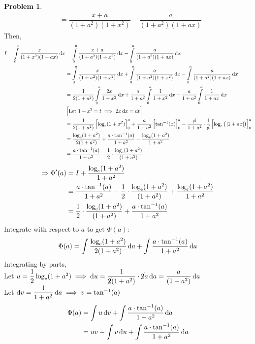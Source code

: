 \documentclass[14]{article}
\theoremstyle{definition}
\newtheorem{prob}{Problem}
\theoremstyle{case}
\begin{document}
\begin{prob}
\begin{align*}
&= \dfrac{x+a}{(1+a^2)(1+x^2)} - \dfrac{a}{(1+a^2)(1+ax)}
\end{align*}
Then,
\begin{align*}
I = \int\limits_0^a \dfrac{x}{(1+x^2)(1+ax)} \dif x &= \int\limits_0^a \dfrac{x+a}{(1+a^2)(1+x^2)} \dif x - \int\limits_0^a \dfrac{a}{(1+a^2)(1+ax)} \dif x\\
&= \int\limits_0^a \dfrac{x}{(1+a^2)(1+x^2)} \dif x + \int\limits_0^a \dfrac{a}{(1+a^2)(1+x^2)} \dif x - \int\limits_0^a \dfrac{a}{(1+a^2)(1+ax)} \dif x\\
&= \dfrac{1}{2(1+a^2)}\int\limits_0^a \dfrac{2x}{1+x^2} \dif x + \dfrac{a}{1+a^2}\int\limits_0^a \dfrac{1}{1+x^2} \dif x - \dfrac{a}{1+a^2} \int\limits_0^a \dfrac1{1+ax} \dif x\\
& \left[\text{Let } 1 + x^2 = t \implies 2x \dif x = \dif t\right]\\
&= \dfrac1{2(1+a^2)} \left[ \log_{\rm e}(1+x^2) \right]_0^a + \dfrac{a}{1+a^2} \left[ \tan^{-1}(x) \right]_0^a - \dfrac{\cancel{a}}{1+a^2} \cdot \dfrac1{\cancel{a}} \left[ \log_{\rm e}\left(\;\abs{1+ax}\right) \right]_0^a\\
&= \dfrac{\log_{\rm e}(1+a^2)}{2(1+a^2)} + \dfrac{a \cdot \tan^{-1}(a)}{1+a^2} - \dfrac{\log_e(1+a^2)}{1+a^2}\\
&= \dfrac{a \cdot \tan^{-1}(a)}{1+a^2} - \dfrac12 \cdot \dfrac{\log_{\rm e}(1+a^2)}{(1+a^2)} 
\end{align*}
\begin{align*}
\Rightarrow \Phi'(a) &= I + \dfrac{\log_e(1+a^2)}{1+a^2}\\
&= \dfrac{a \cdot \tan^{-1}(a)}{1+a^2} - \dfrac12 \cdot \dfrac{\log_{\rm e}(1+a^2)}{(1+a^2)} + \dfrac{\log_e(1+a^2)}{1+a^2}\\
&= \dfrac12 \cdot \dfrac{\log_{\rm e}(1+a^2)}{(1+a^2)} + \dfrac{a \cdot \tan^{-1}(a)}{1+a^2}
\end{align*}
Integrate with respect to $a$ to get $\Phi(a)$:
\[\Phi(a) = \int \dfrac{\log_{\rm e}(1+a^2)}{2(1+a^2)} \dif a + \int \dfrac{a \cdot \tan^{-1}(a)}{1+a^2} \dif a\]
Integrating by parts,\\
Let $u = \dfrac12 \log_{\rm e}(1+a^2) \implies \dif u =\dfrac1{\cancel{2} (1+a^2)} \cdot \cancel{2}a \dif a = \dfrac{a}{(1+a^2)} \dif a$\\
Let $\dif v = \dfrac1{1+a^2} \dif a \implies v = \tan^{-1}(a)$
\begin{align*}
\Phi(a) &= \int u \dif v + \int \dfrac{a \cdot \tan^{-1}(a)}{1+a^2} \dif a\\
&= uv - \int v \dif u + \int \dfrac{a \cdot \tan^{-1}(a)}{1+a^2} \dif a\\

\end{align*}
\end{prob}
\end{document}
